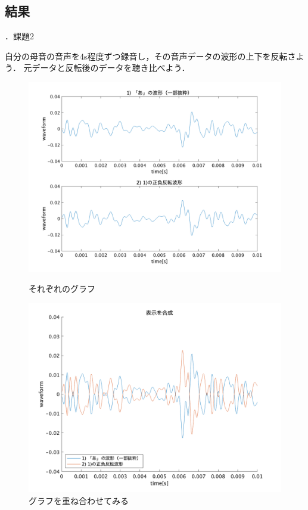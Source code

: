 \documentclass[aspectratio=43]{beamer}
\newcommand{\showsec}{\thesection ．}
\begin{document}
\subsection{結果}
\begin{frame}[t]{\showsec 課題2}
    \begin{exampleblock}{}
        自分の母音の音声を4s程度ずつ録音し，その音声データの波形の上下を反転さよう．
        元データと反転後のデータを聴き比べよう．
    \end{exampleblock}
    \begin{figure}
        \centering
        \begin{minipage}[t]{0.49\textwidth}
            \centering
            \includegraphics[keepaspectratio,width=\textwidth]{no2_ans_1.png}
            \caption{それぞれのグラフ}
        \end{minipage}
        \begin{minipage}[t]{0.49\textwidth}
            \centering
            \includegraphics[keepaspectratio,width=\textwidth]{no2_ans_2.png}
            \caption{グラフを重ね合わせてみる}
        \end{minipage}
    \end{figure}
\end{frame}
\end{document}
